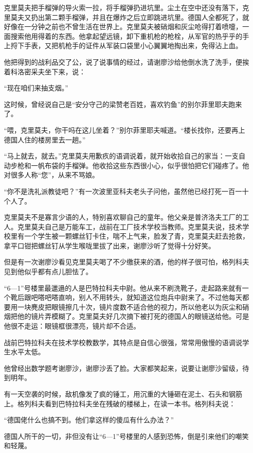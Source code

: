 克里莫夫把手榴弹的导火索一拉，将手榴弹扔进坑里。尘土在空中还没有落下，克里莫夫又扔出第二颗手榴弹，并且在爆炸之后立即跳进坑里。德国人全都死了，就好像在一分钟之前也不曾生活在世界上。克里莫夫被硝烟和灰尘呛得打着喷嚏，一面搜索他用得着的东西。他拿起望远镜，卸下重机枪的枪栓，从军官的热乎乎的手上捋下手表，又把机枪手的证件从军装口袋里小心翼翼地掏出来，免得沾上血。

他把得到的战利品交了公，说了说事情的经过，请谢廖沙给他倒水洗了洗手，便挨着科洛密采夫坐下来，说：

“现在咱们来抽支烟。”

这时候，曾经说自己是“安分守己的梁赞老百姓，喜欢钓鱼”的别尔菲里耶夫跑来了。

“喂，克里莫夫，你干吗在这儿坐着？”别尔菲里耶夫喊道。“楼长找你，还要再上德国人住的楼房里去一趟。”

“马上就去，就去。”克里莫夫用歉疚的语调说着，就开始收拾自己的家当：一支自动步枪和一帆布袋的手榴弹。他收拾这些东西很小心，似乎很怕把它们碰疼了。他对很多人称“您”，从来不骂娘。

“你不是洗礼派教徒吧？”有一次波里亚科夫老头子问他，虽然他已经打死一百一十个人了。

克里莫夫不是寡言少语的人，特别喜欢聊自己的童年。他父亲是普济洛夫工厂的工人。克里莫夫自己是万能车工，战前在工厂技术学校当教师。克里莫夫说，技术学校里有一个学生被一颗螺丝钉卡住，喘不上气来，脸发了青，克里莫夫赶去抢救，拿平口钳把螺丝钉从学生喉咙里拔了出来，谢廖沙听了觉得十分好笑。

但是有一次谢廖沙看见克里莫夫喝了不少缴获来的酒，他的样子很可怕，格列科夫见到他似乎都有点儿胆怯了。

“6—1”号楼里最邋遢的人是巴特拉科夫中尉。他从来不刷洗靴子，走起路来就有一个靴后跟吧嗒吧嗒直响，别人不用转头，就知道这位炮兵中尉来了。不过他每天都要用一块麂皮把眼镜擦几十次，镜片度数不适合他的视力，所以他老以为灰尘和硝烟把他的镜片弄模糊了。克里莫夫好几次摘下被打死的德国人的眼镜送给他。可是他很不走运：眼镜框很漂亮，镜片却不合适。

战前巴特拉科夫在技术学校教数学，其特点是自信心很强，常常用傲慢的语调说学生水平太低。

他曾经出数学题考谢廖沙，谢廖沙丢了脸。大家都笑起来，说要让谢廖沙留级，待到明年。

有一天空袭的时候，敌机像发了疯的锤工，用沉重的大锤砸在泥土、石头和钢筋上。格列科夫看到巴特拉科夫坐在残破的楼梯上，在读一本书。格列科夫说：

“德国佬什么也搞不到。他们拿这样的傻瓜有什么办法？”

德国人所干的一切，非但没有让“6—1”号楼里的人感到恐怖，倒是引来他们的嘲笑和轻蔑。

